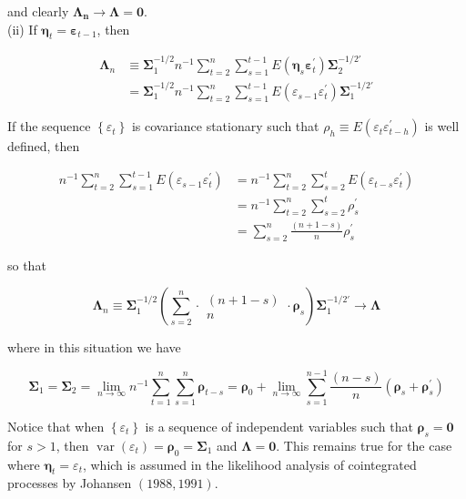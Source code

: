 \documentclass[10pt]{article}
\begin{document}
and clearly $\mathbf{\Lambda}_{\boldsymbol{n}} \rightarrow \mathbf{\Lambda}=\mathbf{0}$.\\
(ii) If $\boldsymbol{\eta}_{t}=\boldsymbol{\varepsilon}_{t-1}$, then

$$
\begin{aligned}
\boldsymbol{\Lambda}_{n} & \equiv \boldsymbol{\Sigma}_{1}^{-1 / 2} n^{-1} \sum_{t=2}^{n} \sum_{s=1}^{t-1} E\left(\boldsymbol{\eta}_{s} \boldsymbol{\varepsilon}_{t}^{\prime}\right) \boldsymbol{\Sigma}_{2}^{-1 / 2 \prime} \\
& =\boldsymbol{\Sigma}_{1}^{-1 / 2} n^{-1} \sum_{t=2}^{n} \sum_{s=1}^{t-1} E\left(\varepsilon_{s-1} \varepsilon_{t}^{\prime}\right) \boldsymbol{\Sigma}_{1}^{-1 / 2 \prime}
\end{aligned}
$$

If the sequence $\left\{\varepsilon_{t}\right\}$ is covariance stationary such that $\rho_{h} \equiv E\left(\varepsilon_{t} \varepsilon_{t-h}^{\prime}\right)$ is well defined, then

$$
\begin{aligned}
n^{-1} \sum_{t=2}^{n} \sum_{s=1}^{t-1} E\left(\varepsilon_{s-1} \varepsilon_{t}^{\prime}\right) & =n^{-1} \sum_{t=2}^{n} \sum_{s=2}^{t} E\left(\varepsilon_{t-s} \varepsilon_{t}^{\prime}\right) \\
& =n^{-1} \sum_{t=2}^{n} \sum_{s=2}^{t} \rho_{s}^{\prime} \\
& =\sum_{s=2}^{n} \frac{(n+1-s)}{n} \rho_{s}^{\prime}
\end{aligned}
$$

so that

$$
\mathbf{\Lambda}_{n} \equiv \boldsymbol{\Sigma}_{1}^{-1 / 2}\left(\sum_{s=2}^{n} \cdot \begin{array}{c}
(n+1-s) \\
n
\end{array} \cdot \boldsymbol{\rho}_{s}\right) \boldsymbol{\Sigma}_{1}^{-1 / 2 \prime} \rightarrow \boldsymbol{\Lambda}
$$

where in this situation we have

$$
\boldsymbol{\Sigma}_{1}=\boldsymbol{\Sigma}_{2}=\lim _{n \rightarrow \infty} n^{-1} \sum_{t=1}^{n} \sum_{s=1}^{n} \boldsymbol{\rho}_{t-s}=\boldsymbol{\rho}_{0}+\lim _{n \rightarrow \infty} \sum_{s=1}^{n-1} \frac{(n-s)}{n}\left(\boldsymbol{\rho}_{s}+\boldsymbol{\rho}_{s}^{\prime}\right)
$$

Notice that when $\left\{\varepsilon_{t}\right\}$ is a sequence of independent variables such that $\boldsymbol{\rho}_{s}=\mathbf{0}$ for $s>1$, then $\operatorname{var}\left(\varepsilon_{t}\right)=\boldsymbol{\rho}_{0}=\boldsymbol{\Sigma}_{1}$ and $\boldsymbol{\Lambda}=\mathbf{0}$. This remains true for the case where $\boldsymbol{\eta}_{t}=\varepsilon_{t}$, which is assumed in the likelihood analysis of cointegrated processes by Johansen $(1988,1991)$.
\end{document}
